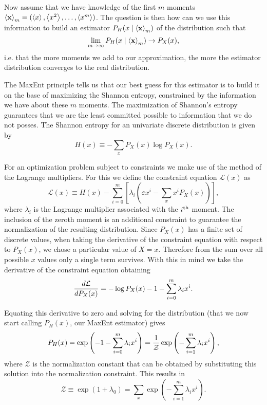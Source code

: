 Now assume that we have knowledge of the first $m$ moments $\mathbf{\left\langle x \right\rangle}_m = (
\left\langle x \right\rangle, \left\langle x^2 \right\rangle, \ldots, \left\langle x^m \right\rangle )$. The question is then how can we use this
information to build an estimator $P_H(x \mid \mathbf{\left\langle x \right\rangle}_m)$ of the
distribution
such that
\begin{equation}
  \lim_{m \rightarrow \infty} P_H(x \mid \mathbf{\left\langle x \right\rangle}_m) \rightarrow P_X(x),
\end{equation}
i.e. that the more moments we add to our approximation, the more the estimator
distribution converges to the real distribution.

The MaxEnt principle tells us that our best guess for this estimator is to build
it on the base of maximizing the Shannon entropy, constrained by the information
we have about these $m$ moments. The maximization of Shannon's entropy
guarantees that we are the least committed possible to information that we do
not posses. The Shannon entropy for an univariate discrete distribution is
given by \cite{Shannon1948}
\begin{equation}
  H(x) \equiv - \sum_x P_X(x) \log P_X(x).
\end{equation}

For an optimization problem subject to constraints we make use of the method of
the Lagrange multipliers. For this we define the constraint equation
$\mathcal{L}(x)$ as
\begin{equation}
  \mathcal{L}(x) \equiv H(x) - \sum_{i=0}^m
  \left[ \lambda_i \left( \ee{x^i} - \sum_x x^i P_X(x) \right) \right],
  \label{seq_constraint_eq}
\end{equation}
where $\lambda_i$ is the Lagrange multiplier associated with the $i^\text{th}$ moment.
The inclusion of the zeroth moment is an additional constraint to guarantee the
normalization of the resulting distribution. Since $P_X(x)$ has a finite set of
discrete values, when taking the derivative of the constraint equation with
respect to $P_X(x)$, we chose a particular value of $X = x$. Therefore from the
sum over all possible $x$ values only a single term survives. With this in mind
we take the derivative of the constraint equation obtaining
\begin{equation}
  {d\mathcal{L} \over d P_X(x)} = -\log P_X(x) - 1 -
  \sum_{i=0}^m \lambda_i x^i.
\end{equation}

Equating this derivative to zero and solving for the distribution (that we now
start calling $P_H(x)$, our MaxEnt estimator) gives
\begin{equation}
  P_H(x) = \exp \left(- 1 - \sum_{i=0}^m \lambda_i x^i \right)
         ={1 \over \mathcal{Z}}
         \exp \left( - \sum_{i=1}^m \lambda_i x^i \right),
  \label{eq_maxEnt}
\end{equation}
where $\mathcal{Z}$ is the normalization constant that can be obtained by
substituting this solution into the normalization constraint. This results in
\begin{equation}
  \mathcal{Z} \equiv \exp\left( 1 + \lambda_0 \right) =
  \sum_x \exp \left( - \sum_{i=1}^m \lambda_i x^i \right).
\end{equation}

